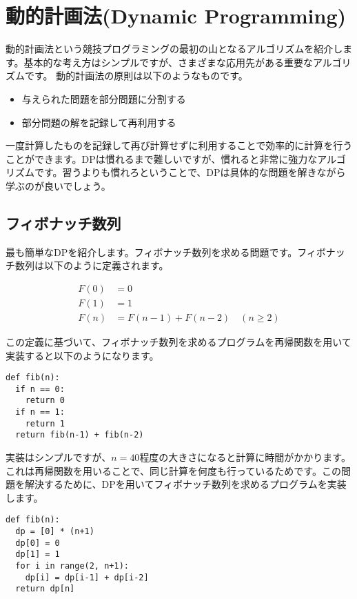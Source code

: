 \documentclass{jlreq}
\begin{document}
\section{動的計画法(Dynamic Programming)}
動的計画法という競技プログラミングの最初の山となるアルゴリズムを紹介します。基本的な考え方はシンプルですが、さまざまな応用先がある重要なアルゴリズムです。
動的計画法の原則は以下のようなものです。

\begin{itemize}
  \item 与えられた問題を部分問題に分割する
  \item 部分問題の解を記録して再利用する
\end{itemize}

一度計算したものを記録して再び計算せずに利用することで効率的に計算を行うことができます。DPは慣れるまで難しいですが、慣れると非常に強力なアルゴリズムです。習うよりも慣れろということで、DPは具体的な問題を解きながら学ぶのが良いでしょう。

\subsection{フィボナッチ数列}
最も簡単なDPを紹介します。フィボナッチ数列を求める問題です。フィボナッチ数列は以下のように定義されます。

\begin{align*}
  F(0) &= 0 \\
  F(1) &= 1 \\
  F(n) &= F(n-1) + F(n-2) \quad (n \geq 2)
\end{align*}

この定義に基づいて、フィボナッチ数列を求めるプログラムを再帰関数を用いて実装すると以下のようになります。
\begin{lstlisting}[caption=再帰関数を用いたフィボナッチ数列の実装, frame=TRBL, label={rec_fib}]
def fib(n):
  if n == 0:
    return 0
  if n == 1:
    return 1
  return fib(n-1) + fib(n-2)
\end{lstlisting}

実装はシンプルですが、$n = 40$程度の大きさになると計算に時間がかかります。これは再帰関数を用いることで、同じ計算を何度も行っているためです。この問題を解決するために、DPを用いてフィボナッチ数列を求めるプログラムを実装します。

\begin{lstlisting}[caption=DPを用いたフィボナッチ数列の実装, frame=TRBL, label={dp_fib}]
def fib(n):
  dp = [0] * (n+1)
  dp[0] = 0
  dp[1] = 1
  for i in range(2, n+1):
    dp[i] = dp[i-1] + dp[i-2]
  return dp[n]
\end{lstlisting}
\end{document}
